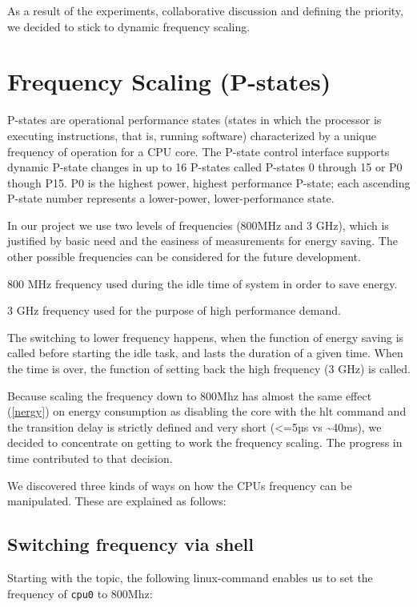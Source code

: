 \documentclass[]{report}
\begin{document}
As a result of the experiments, collaborative discussion and defining
the priority, we decided to stick to dynamic frequency scaling.

\section{Frequency Scaling (P-states)}\label{frequency-scaling-p-states}

P-states are operational performance states (states in which the
processor is executing instructions, that is, running software)
characterized by a unique frequency of operation for a CPU core. The
P-state control interface supports dynamic P-state changes in up to 16
P-states called P-states 0 through 15 or P0 though P15. P0 is the
highest power, highest performance P-state; each ascending P-state
number represents a lower-power, lower-performance state.

In our project we use two levels of frequencies (800MHz and 3 GHz),
which is justified by basic need and the easiness of measurements for
energy saving. The other possible frequencies can be considered for the
future development.

800 MHz frequency used during the idle time of system in order to save
energy.

3 GHz frequency used for the purpose of high performance demand.

The switching to lower frequency happens, when the function of energy
saving is called before starting the idle task, and lasts the duration
of a given time. When the time is over, the function of setting back the
high frequency (3 GHz) is called.

Because scaling the frequency down to 800Mhz has almost the same effect
(\ref{nergy}) on energy consumption as disabling the core with the hlt
command and the transition delay is strictly defined and very short
(\textless{}=5µs vs \textasciitilde{}40ms), we decided to concentrate on
getting to work the frequency scaling. The progress in time contributed
to that decision.

We discovered three kinds of ways on how the CPUs frequency can be
manipulated. These are explained as follows:

\subsection{Switching frequency via
shell}\label{switching-frequency-via-shell}

Starting with the topic, the following linux-command enables us to set
the frequency of \lstinline!cpu0! to 800Mhz:
\end{document}
